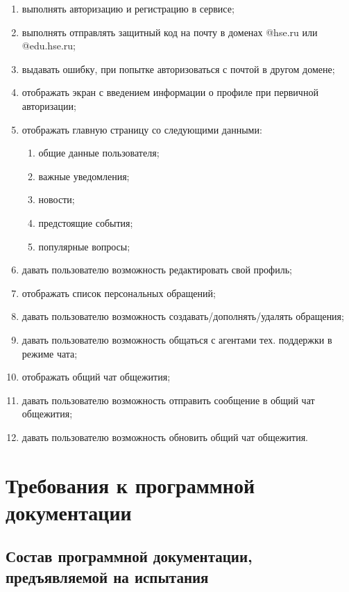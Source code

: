 \documentclass{../includes/TechDoc}
\begin{document}
    \begin{enumerate}
        \item выполнять авторизацию и регистрацию в сервисе;
        \item выполнять отправлять защитный код на почту в доменах @hse.ru или @edu.hse.ru;
        \item выдавать ошибку, при попытке авторизоваться с почтой в другом домене;
        \item отображать экран с введением информации о профиле при первичной авторизации;
        \item отображать главную страницу со следующими данными:
        \begin{enumerate}
            \item общие данные пользователя;
            \item важные уведомления;
            \item новости;
            \item предстоящие события;
            \item популярные вопросы;
        \end{enumerate}
        \item давать пользователю возможность редактировать свой профиль;
        \item отображать список персональных обращений;
        \item давать пользователю возможность создавать/дополнять/удалять обращения;
        \item давать пользователю возможность общаться с агентами тех. поддержки в режиме чата;
        \item отображать общий чат общежития;
        \item давать пользователю возможность отправить сообщение в общий чат общежития;
        \item давать пользователю возможность обновить общий чат общежития.
    \end{enumerate}


    \section{Требования к программной документации}

    \subsection{Состав программной документации, предъявляемой на испытания}
\end{document}

